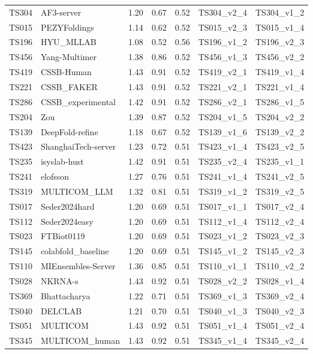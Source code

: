 \begin{longtable}{lllllll}
TS304 & AF3-server & 1.20 & 0.67 & 0.52 & TS304\_v2\_4 & TS304\_v1\_2 \\ 
TS015 & PEZYFoldings & 1.14 & 0.62 & 0.52 & TS015\_v2\_3 & TS015\_v1\_4 \\ 
TS196 & HYU\_MLLAB & 1.08 & 0.52 & 0.56 & TS196\_v1\_2 & TS196\_v2\_3 \\ 
TS456 & Yang-Multimer & 1.38 & 0.86 & 0.52 & TS456\_v1\_3 & TS456\_v2\_2 \\ 
TS419 & CSSB-Human & 1.43 & 0.91 & 0.52 & TS419\_v2\_1 & TS419\_v1\_4 \\ 
TS221 & CSSB\_FAKER & 1.43 & 0.91 & 0.52 & TS221\_v2\_1 & TS221\_v1\_4 \\ 
TS286 & CSSB\_experimental & 1.42 & 0.91 & 0.52 & TS286\_v2\_1 & TS286\_v1\_5 \\ 
TS204 & Zou & 1.39 & 0.87 & 0.52 & TS204\_v1\_5 & TS204\_v2\_2 \\ 
TS139 & DeepFold-refine & 1.18 & 0.67 & 0.52 & TS139\_v1\_6 & TS139\_v2\_2 \\ 
TS423 & ShanghaiTech-server & 1.23 & 0.72 & 0.51 & TS423\_v1\_4 & TS423\_v2\_5 \\ 
TS235 & isyslab-hust & 1.42 & 0.91 & 0.51 & TS235\_v2\_4 & TS235\_v1\_1 \\ 
TS241 & elofsson & 1.27 & 0.76 & 0.51 & TS241\_v1\_4 & TS241\_v2\_5 \\ 
TS319 & MULTICOM\_LLM & 1.32 & 0.81 & 0.51 & TS319\_v1\_2 & TS319\_v2\_5 \\ 
TS017 & Seder2024hard & 1.20 & 0.69 & 0.51 & TS017\_v1\_1 & TS017\_v2\_4 \\ 
TS112 & Seder2024easy & 1.20 & 0.69 & 0.51 & TS112\_v1\_4 & TS112\_v2\_4 \\ 
TS023 & FTBiot0119 & 1.20 & 0.69 & 0.51 & TS023\_v1\_2 & TS023\_v2\_3 \\ 
TS145 & colabfold\_baseline & 1.20 & 0.69 & 0.51 & TS145\_v1\_2 & TS145\_v2\_3 \\ 
TS110 & MIEnsembles-Server & 1.36 & 0.85 & 0.51 & TS110\_v1\_1 & TS110\_v2\_2 \\ 
TS028 & NKRNA-s & 1.43 & 0.92 & 0.51 & TS028\_v2\_2 & TS028\_v1\_4 \\ 
TS369 & Bhattacharya & 1.22 & 0.71 & 0.51 & TS369\_v1\_3 & TS369\_v2\_4 \\ 
TS040 & DELCLAB & 1.21 & 0.70 & 0.51 & TS040\_v1\_3 & TS040\_v2\_3 \\ 
TS051 & MULTICOM & 1.43 & 0.92 & 0.51 & TS051\_v1\_4 & TS051\_v2\_4 \\ 
TS345 & MULTICOM\_human & 1.43 & 0.92 & 0.51 & TS345\_v1\_4 & TS345\_v2\_4 \\ 

\end{longtable}
